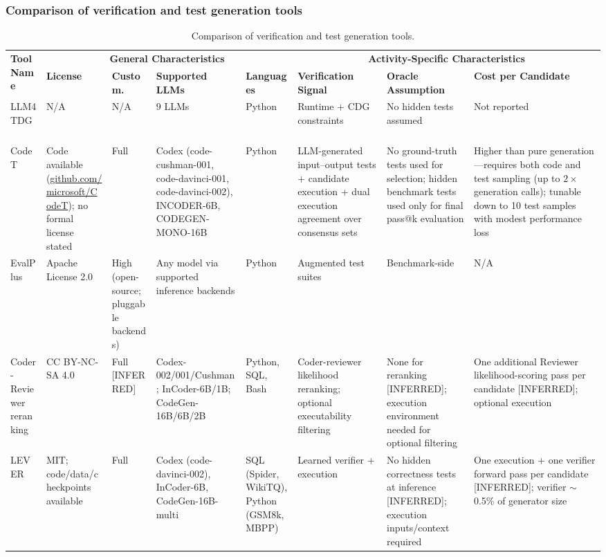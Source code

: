 \documentclass[10pt,a4paper]{article}
\begin{document}
\subsubsection{Comparison of verification and test generation tools}
\begin{table}[!t]
\centering
\caption{Comparison of verification and test generation tools.}
\label{tab:cmp_verification}
\footnotesize
\setlength{\tabcolsep}{3pt}
\renewcommand{\arraystretch}{1.15}
\begin{tabularx}{\textwidth}{@{}p{48pt}p{55pt}p{30pt}p{68pt}p{62pt}p{72pt}p{78pt}X@{}}
\toprule
\multirow{2}{*}{\textbf{Tool Name}} & \multicolumn{4}{c}{\textbf{General Characteristics}} & \multicolumn{3}{c}{\textbf{Activity-Specific Characteristics}} \\
\cmidrule(lr){2-5} \cmidrule(lr){6-8}
 & \textbf{License} & \textbf{Custom.} & \textbf{Supported LLMs} & \textbf{Languages} & \textbf{Verification Signal} & \textbf{Oracle Assumption} & \textbf{Cost per Candidate} \\
\midrule
LLM4TDG~\cite{liu2025llm4tdg} & N/A & N/A & 9 LLMs & Python & Runtime + CDG constraints & No hidden tests assumed & Not reported \\
CodeT~\cite{chenbei2023} & Code available (\url{github.com/microsoft/CodeT}); no formal license stated & Full & Codex (code-cushman-001, code-davinci-001, code-davinci-002), INCODER-6B, CODEGEN-MONO-16B & Python & LLM-generated input--output tests + candidate execution + dual execution agreement over consensus sets & No ground-truth tests used for selection; hidden benchmark tests used only for final pass@k evaluation & Higher than pure generation---requires both code and test sampling (up to $2\times$ generation calls); tunable down to 10 test samples with modest performance loss \\
EvalPlus~\cite{liu2023evalplus} & Apache License 2.0 & High (open-source; pluggable backends) & Any model via supported inference backends & Python & Augmented test suites & Benchmark-side & N/A \\
Coder-Reviewer reranking~\cite{zhangt2023coderreviewer} & CC BY-NC-SA 4.0 & Full [INFERRED] & Codex-002/001/Cushman; InCoder-6B/1B; CodeGen-16B/6B/2B & Python, SQL, Bash & Coder-reviewer likelihood reranking; optional executability filtering & None for reranking [INFERRED]; execution environment needed for optional filtering & One additional Reviewer likelihood-scoring pass per candidate [INFERRED]; optional execution \\
LEVER~\cite{ni2023lever} & MIT; code/data/checkpoints available & Full & Codex (code-davinci-002), InCoder-6B, CodeGen-16B-multi & SQL (Spider, WikiTQ), Python (GSM8k, MBPP) & Learned verifier + execution & No hidden correctness tests at inference [INFERRED]; execution inputs/context required & One execution + one verifier forward pass per candidate [INFERRED]; verifier $\sim$0.5\% of generator size \\

\end{tabularx}
\end{table}
\end{document}
